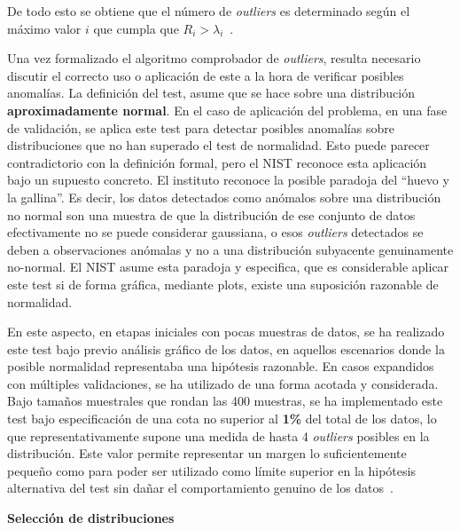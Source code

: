 De todo esto se obtiene que el número de \textit{outliers} es determinado según 
el máximo valor $i$ que cumpla que $R_i > \lambda_i$~\cite{nist2012outlier, rosner1983}.


Una vez formalizado el algoritmo comprobador de \textit{outliers}, resulta necesario discutir el correcto
uso o aplicación de este a la hora de verificar posibles anomalías. La definición del test, asume que se hace
sobre una distribución \textbf{aproximadamente normal}. En el caso de aplicación del problema, en una 
fase de validación, se aplica este test para detectar posibles anomalías sobre distribuciones que no han
superado el test de normalidad. Esto puede parecer contradictorio con la definición formal, pero el 
NIST reconoce esta aplicación bajo un supuesto concreto. El instituto reconoce la posible paradoja
del \enquote{huevo y la gallina}. Es decir, los datos detectados como anómalos sobre una distribución 
no normal son una muestra de que la distribución de ese conjunto de datos efectivamente no se puede considerar
gaussiana, o esos \textit{outliers} detectados se deben a observaciones anómalas y no a una distribución subyacente 
genuinamente no-normal. El NIST asume esta paradoja y especifica, que es considerable aplicar este test
si de forma gráfica, mediante plots, existe una suposición razonable de normalidad.\cite{nist2012outlier}

En este aspecto, en etapas iniciales con pocas muestras de datos, se ha realizado este test bajo previo análisis 
gráfico de los datos, en aquellos escenarios donde la posible normalidad representaba una hipótesis razonable.
En casos expandidos con múltiples validaciones, se ha utilizado de una forma acotada y considerada.
Bajo tamaños muestrales que rondan las 400 muestras, se ha implementado este test bajo especificación de una cota
no superior al \textbf{1\%} del total de los datos, lo que representativamente supone una medida de hasta 4
\textit{outliers} posibles en la distribución. Este valor permite representar un margen lo suficientemente pequeño como 
para poder ser utilizado como límite superior en la hipótesis alternativa del test sin dañar el comportamiento
genuino de los datos~\cite{wilcox2012}.

\medskip
\noindent\textbf{Selección de distribuciones}

